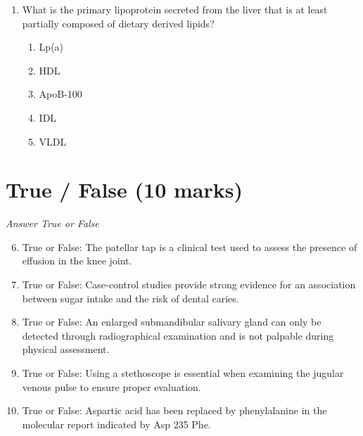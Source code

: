 \documentclass[12pt]{article}
\begin{document}
\begin{enumerate}[label=\arabic*.]
\begin{enumerate}[label=(\alph*)]
    \item arise from the ascending aorta and do not fill during either systole or diastole.
    \item arise from the arch of the aorta and do not fill during either systole or diastole.
    \item arise from the ascending aorta and fill during systole.
    \item arise from the arch of the aorta and fill during systole.
    \item arise from the pulmonary artery and fill during systole.
\end{enumerate}
\item What is the primary lipoprotein secreted from the liver that is at least partially composed of dietary derived lipids?
\begin{enumerate}[label=(\alph*)]
    \item Lp(a)
    \item HDL
    \item ApoB-100
    \item IDL
    \item VLDL
\end{enumerate}
\end{enumerate}

\section*{True / False (10 marks)}
\textit{Answer True or False}
\begin{enumerate}[label=\arabic*.]
\setcounter{enumi}{5}
\item True or False: The patellar tap is a clinical test used to assess the presence of effusion in the knee joint.
\item True or False: Case-control studies provide strong evidence for an association between sugar intake and the risk of dental caries.
\item True or False: An enlarged submandibular salivary gland can only be detected through radiographical examination and is not palpable during physical assessment.
\item True or False: Using a stethoscope is essential when examining the jugular venous pulse to ensure proper evaluation.
\item True or False: Aspartic acid has been replaced by phenylalanine in the molecular report indicated by Asp 235 Phe.
\end{enumerate}
\end{document}
